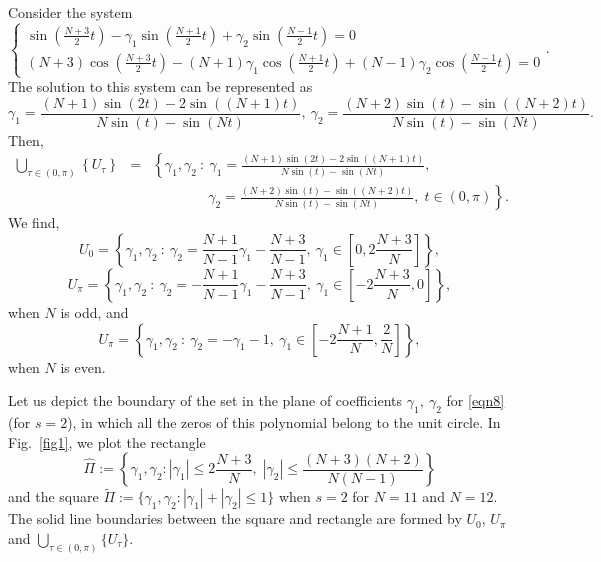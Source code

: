 \documentclass[12pt]{article}
\newcommand{\pa}[1]{\left(#1\right)}
\newcommand{\br}[1]{\left[#1\right]}
\newcommand{\cb}[1]{\left\{#1\right\}}
\begin{document}
\begin{itemize}
Consider the system
\begin{displaymath}
\begin{cases}
\displaystyle \sin\pa{\frac{N + 3}{2}t} - \gamma_1\sin\pa{\frac{N + 1}{2}t} + \gamma_2\sin\pa{\frac{N - 1}{2}t} = 0 \\
\displaystyle (N + 3)\cos\pa{\frac{N + 3}{2}t} - (N + 1)\gamma_1\cos\pa{\frac{N + 1}{2}t} + (N - 1)\gamma_2\cos\pa{\frac{N - 1}{2}t} = 0
\end{cases}.
\end{displaymath}
The solution to this system can be represented as
\begin{displaymath}
\gamma_1 = \frac{(N + 1)\sin(2t) - 2\sin\pa{(N + 1)t}}{N\sin(t) - \sin(Nt)}, \ \gamma_2 = \frac{(N + 2)\sin(t) - \sin\pa{(N + 2)t}}{N\sin(t) - \sin(Nt)}.
\end{displaymath}
Then,
\begin{eqnarray*}
\bigcup_{\tau \in \pa{0,\pi}}\cb{U_\tau} &=& \left\{ \gamma_1, \gamma_2 \ : \ \gamma_1 = \frac{(N + 1)\sin(2t) - 2\sin\pa{(N + 1)t}}{N\sin(t) - \sin(Nt)}, \right. \\
& & \qquad \qquad \left. \gamma_2 = \frac{(N + 2)\sin(t) - \sin\pa{(N + 2)t}}{N\sin(t) - \sin(Nt)},\; t \in \pa{0,\pi}\right\}.
\end{eqnarray*}
We find,
\begin{displaymath}
U_0 = \cb{\gamma_1,\gamma_2 \ : \ \gamma_2 = \frac{N + 1}{N - 1}\gamma_1 - \frac{N + 3}{N - 1}, \ \gamma_1 \in \br{0,2\frac{N + 3}{N}}},
\end{displaymath}
\begin{displaymath}
U_{\pi} = \cb{\gamma_1,\gamma_2 \ : \ \gamma_2 = -\frac{N + 1}{N - 1}\gamma_1 - \frac{N + 3}{N - 1}, \ \gamma_1 \in \br{-2\frac{N + 3}{N},0}},
\end{displaymath}
when $N$ is odd, and
\begin{displaymath}
U_{\pi} = \cb{\gamma_1,\gamma_2 \ : \ \gamma_2 = -\gamma_1 - 1, \ \gamma_1 \in \br{-2\frac{N + 1}{N},\frac{2}{N}}},
\end{displaymath}
when $N$ is even.
\end{itemize}

Let us depict the boundary of the set in the plane of coefficients $\gamma_1, \ \gamma_2$ for \eqref{eqn8} (for $s = 2$), in which all the zeros of this polynomial belong to the unit circle. In Fig.~\ref{fig1}, we plot the rectangle
$$
\hat\Pi:=\left\{
 \gamma_1, \gamma_2: |\gamma_1|\le 2\frac{N+3}N,\; |\gamma_2|\le \frac{(N+3)(N+2)}{N(N-1)} 
 \right\}
$$
and the square $\tilde \Pi:=\{\gamma_1, \gamma_2: |\gamma_1|+|\gamma_2|\le 1\}$ when $s = 2$ for $N = 11$ and $N = 12$. The solid line boundaries between the square and rectangle are formed by $U_0$, $U_{\pi}$ and $\displaystyle \bigcup_{\tau \in (0,\pi)} \{U_{\tau}\}$.
\end{document}
